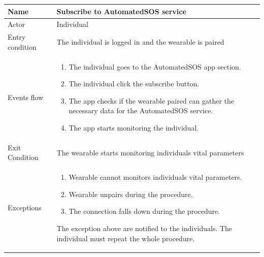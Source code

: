 \begin{table}[p]
\centering
\begin{tabular}{|l|p{11cm}|}
    \hline
    Name & Subscribe to AutomatedSOS service
    \\ \hline
    Actor & Individual
    \\ \hline 
    Entry condition & The individual is logged in and the wearable is paired
        \\ \hline
    Events flow &
    \begin{enumerate}
	\item The individual goes to the AutomatedSOS app section.
    \item The individual click the subscribe button.
    \item The app checks if the wearable paired can gather the necessary data for the AutomatedSOS service.
    \item The app starts monitoring the individual.
    \end{enumerate}
     \\ \hline
     Exit Condition & The wearable starts monitoring individuals vital parameters
     \\
    \hline
    Exceptions &
        \begin{enumerate}
    \item Wearable cannot monitors individuals vital parameters.
    \item Wearable unpairs during the procedure.
    \item The connection falls down during the procedure.
    \end{enumerate}
      The exception above are notified to the individuals. The individual must repeat the whole 
      procedure.
      \\
    \hline
\end{tabular}
\end{table}

